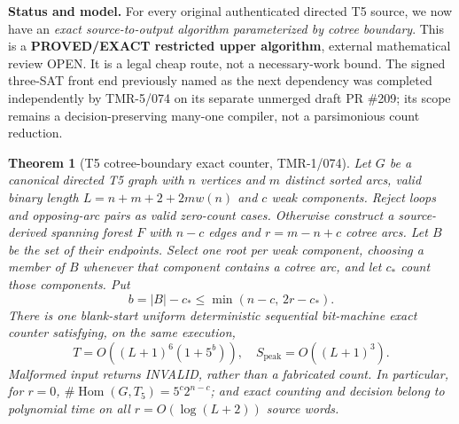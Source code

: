 \documentclass[11pt]{article}
\newtheorem{theorem}{Theorem}
\begin{document}
\noindent\textbf{Status and model.}
For every original authenticated directed T5 source, we now have an
\emph{exact source-to-output algorithm parameterized by cotree boundary}.
This is a \textbf{PROVED/EXACT restricted upper algorithm}, external
mathematical review OPEN. It is a legal cheap route, not a necessary-work
bound. The signed three-SAT front end previously named as the next
dependency was completed independently by TMR-5/074 on its separate
unmerged draft PR \#209; its scope remains a decision-preserving
many-one compiler, not a parsimonious count reduction.

\begin{theorem}[T5 cotree-boundary exact counter, TMR-1/074]
Let $G$ be a canonical directed T5 graph with $n$ vertices and $m$
distinct sorted arcs, valid binary length
$L=n+m+2+2mw(n)$ and $c$ weak components. Reject loops and
opposing-arc pairs as valid zero-count cases. Otherwise construct a
source-derived spanning forest $F$ with $n-c$ edges and $r=m-n+c$
cotree arcs. Let $B$ be the set of their endpoints. Select one root
per weak component, choosing a member of $B$ whenever that component
contains a cotree arc, and let $c_*$ count those components. Put
\[
 b=|B|-c_*\le\min(n-c,\,2r-c_*).
\]
There is one blank-start uniform deterministic sequential bit-machine
exact counter satisfying, \emph{on the same execution},
\[
 \boxed{T=O((L+1)^6(1+5^b)),\quad
 S_{\mathrm{peak}}=O((L+1)^3).}
\]
Malformed input returns INVALID, rather than a fabricated count.
In particular, for $r=0$,
$\boxed{\#\operatorname{Hom}(G,T_5)=5^c2^{n-c}}$;
and exact counting and decision belong to polynomial time on
all $r=O(\log(L+2))$ source words.
\end{theorem}
\end{document}
